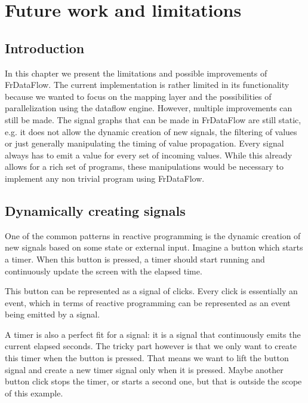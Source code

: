 \chapter{Future work and limitations}

\section{Introduction}

In this chapter we present the limitations and possible improvements of FrDataFlow. 
The current implementation is rather limited in its functionality because we wanted to focus on the mapping layer and the possibilities of parallelization using the dataflow engine.
However, multiple improvements can still be made. The signal graphs that can be made in FrDataFlow are still static, e.g. it does not allow the dynamic creation of new signals, the filtering of values or just generally manipulating the timing of value propagation. Every signal always has to emit a value for every set of incoming values. While this already allows for a rich set of programs, these manipulations would be necessary to implement any non trivial program using FrDataFlow. 

\newpage
\section{Dynamically creating signals}

One of the common patterns in reactive programming is the dynamic creation of new signals based on some state or external input. Imagine a button which starts a timer. When this button is pressed, a timer should start running and continuously update the screen with the elapsed time.

This button can be represented as a signal of clicks. Every click is essentially an event, which in terms of reactive programming can be represented as an event being emitted by a signal.

A timer is also a perfect fit for a signal: it is a signal that continuously emits the current elapsed seconds. The tricky part however is that we only want to create this timer when the button is pressed. That means we want to lift the button signal and create a new timer signal only when it is pressed. Maybe another button click stops the timer, or starts a second one, but that is outside the scope of this example.

